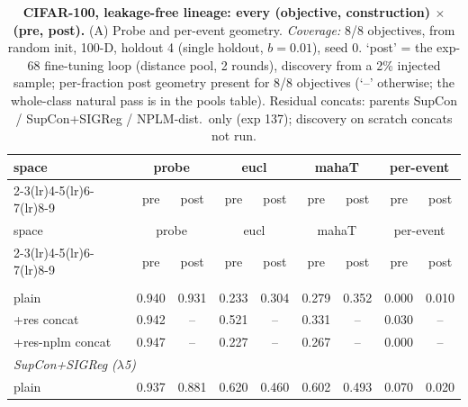 \begin{landscape}
\begin{center}
\footnotesize
\setlength{\tabcolsep}{3pt}
\begin{longtable}{lcccccccc}
\caption{\textbf{CIFAR-100, leakage-free lineage: every (objective, construction) $\times$ (pre, post).} (A) Probe and per-event geometry. \emph{Coverage:} 8/8 objectives, from random init, 100-D, holdout 4 (single holdout, $b=0.01$), seed 0. `post' = the exp-68 fine-tuning loop (distance pool, 2 rounds), discovery from a 2\% injected sample; per-fraction post geometry present for 8/8 objectives (`--' otherwise; the whole-class natural pass is in the pools table). Residual concats: parents SupCon / SupCon+SIGReg / NPLM-dist.\ only (exp 137); discovery on scratch concats not run.}\label{tab:grid_cifar100_scratch_a}\\
\toprule
space & \multicolumn{2}{c}{probe} & \multicolumn{2}{c}{eucl} & \multicolumn{2}{c}{mahaT} & \multicolumn{2}{c}{per-event} \\
\cmidrule(lr){2-3}\cmidrule(lr){4-5}\cmidrule(lr){6-7}\cmidrule(lr){8-9}
& pre & post & pre & post & pre & post & pre & post \\
\midrule
\endfirsthead
\toprule
space & \multicolumn{2}{c}{probe} & \multicolumn{2}{c}{eucl} & \multicolumn{2}{c}{mahaT} & \multicolumn{2}{c}{per-event} \\
\cmidrule(lr){2-3}\cmidrule(lr){4-5}\cmidrule(lr){6-7}\cmidrule(lr){8-9}
& pre & post & pre & post & pre & post & pre & post \\
\midrule
\endhead
\bottomrule
\endfoot
\multicolumn{9}{l}{\emph{SupCon}} \\
\quad plain & 0.940 & 0.931 & 0.233 & 0.304 & 0.279 & 0.352 & 0.000 & 0.010 \\
\quad +res concat & 0.942 & -- & 0.521 & -- & 0.331 & -- & 0.030 & -- \\
\quad +res-nplm concat & 0.947 & -- & 0.227 & -- & 0.267 & -- & 0.000 & -- \\
\multicolumn{9}{l}{\emph{SupCon+SIGReg ($\lambda$5)}} \\
\quad plain & 0.937 & 0.881 & 0.620 & 0.460 & 0.602 & 0.493 & 0.070 & 0.020 \\

\end{longtable}
\end{center}
\end{landscape}
